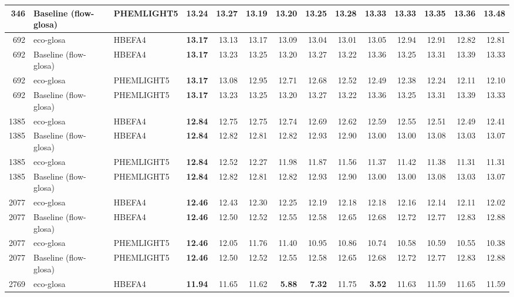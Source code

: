 \begin{table}[htb]
{\begin{tabular}{r l l r *{10}{r}}
    346 & Baseline (\ac{flow-glosa}) & PHEMLIGHT5 & \textbf{13.24} & 13.27 & 13.19 & 13.20 & 13.25 & 13.28 & 13.33 & 13.33 & 13.35 & 13.36 & \textbf{13.48}\\
    \midrule
    692 & \ac{eco-glosa} & HBEFA4 & \textbf{13.17} & 13.13 & 13.17 & 13.09 & 13.04 & 13.01 & 13.05 & 12.94 & 12.91 & 12.82 & 12.81\\
    692 & Baseline (\ac{flow-glosa}) & HBEFA4 & \textbf{13.17} & 13.23 & 13.25 & 13.20 & 13.27 & 13.22 & 13.36 & 13.25 & 13.31 & 13.39 & 13.33\\
    692 & \ac{eco-glosa} & PHEMLIGHT5 & \textbf{13.17} & 13.08 & 12.95 & 12.71 & 12.68 & 12.52 & 12.49 & 12.38 & 12.24 & 12.11 & 12.10\\
    692 & Baseline (\ac{flow-glosa}) & PHEMLIGHT5 & \textbf{13.17} & 13.23 & 13.25 & 13.20 & 13.27 & 13.22 & 13.36 & 13.25 & 13.31 & 13.39 & 13.33\\
    \midrule
    1385 & \ac{eco-glosa} & HBEFA4 & \textbf{12.84} & 12.75 & 12.75 & 12.74 & 12.69 & 12.62 & 12.59 & 12.55 & 12.51 & 12.49 & 12.41\\
    1385 & Baseline (\ac{flow-glosa}) & HBEFA4 & \textbf{12.84} & 12.82 & 12.81 & 12.82 & 12.93 & 12.90 & 13.00 & 13.00 & 13.08 & 13.03 & 13.07\\
    1385 & \ac{eco-glosa} & PHEMLIGHT5 & \textbf{12.84} & 12.52 & 12.27 & 11.98 & 11.87 & 11.56 & 11.37 & 11.42 & 11.38 & 11.31 & 11.31\\
    1385 & Baseline (\ac{flow-glosa}) & PHEMLIGHT5 & \textbf{12.84} & 12.82 & 12.81 & 12.82 & 12.93 & 12.90 & 13.00 & 13.00 & 13.08 & 13.03 & 13.07\\
    \midrule
    2077 & \ac{eco-glosa} & HBEFA4 & \textbf{12.46} & 12.43 & 12.30 & 12.25 & 12.19 & 12.18 & 12.18 & 12.16 & 12.14 & 12.11 & 12.02\\
    2077 & Baseline (\ac{flow-glosa}) & HBEFA4 & \textbf{12.46} & 12.50 & 12.52 & 12.55 & 12.58 & 12.65 & 12.68 & 12.72 & 12.77 & 12.83 & 12.88\\
    2077 & \ac{eco-glosa} & PHEMLIGHT5 & \textbf{12.46} & 12.05 & 11.76 & 11.40 & 10.95 & 10.86 & 10.74 & 10.58 & 10.59 & 10.55 & 10.38\\
    2077 & Baseline (\ac{flow-glosa}) & PHEMLIGHT5 & \textbf{12.46} & 12.50 & 12.52 & 12.55 & 12.58 & 12.65 & 12.68 & 12.72 & 12.77 & 12.83 & 12.88\\
    \midrule
    2769 & \ac{eco-glosa} & HBEFA4 & \textbf{11.94} & 11.65 & 11.62 & \textbf{5.88} & \textbf{7.32} & 11.75 & \textbf{3.52} & 11.63 & 11.59 & 11.65 & 11.59\\

\end{tabular}}
\end{table}
